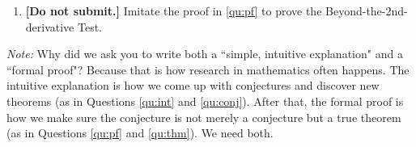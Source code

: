 \documentclass[12pt]{exam}
\begin{document}
\begin{enumerate}
\begin{enumerate}
		Using the same ideas as in Question \ref{qu:int}, complete the following statements, and give an intuitive explanation for them:
			\begin{itemize}
				\item  IF ..., THEN $f$ has a local minimum at $a$.
				\item  IF ..., THEN $f$ has a local maximum at $a$.
				\item  IF ..., THEN $f$ does not have a local extremum at $a$.
			\end{itemize}
		When you complete this, you will have come up with a new theorem.  Let's call it the ``Beyond-the-2nd-derivative Test".   Make sure your theorem takes care of all possible cases.  
		\item \label{qu:thm}  {\bf [Do not submit.]}  Imitate the proof in \ref{qu:pf} to prove the Beyond-the-2nd-derivative Test.		
	\end{enumerate}

\emph{Note:}  Why did we ask you to write both a ``simple, intuitive explanation" and a ``formal proof"?  Because that is how research in mathematics often happens.  The intuitive explanation is how we come up with conjectures and discover new theorems (as in Questions \ref{qu:int} and \ref{qu:conj}).   After that, the formal proof is how we make sure the conjecture is not merely a conjecture but a true theorem (as in Questions \ref{qu:pf} and \ref{qu:thm}).   We need both.

\end{enumerate}
\end{document}
